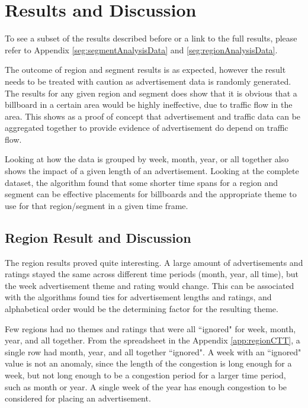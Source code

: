 \documentclass[titlepage,twocolumn]{article}
\begin{document}
\section{Results and Discussion}

\par To see a subset of the results described before or a link to the full results, please refer to Appendix \ref{seg:segmentAnalysisData} and \ref{seg:regionAnalysisData}.


\par The outcome of region and segment results is as expected, however the result needs to be treated with caution as advertisement data is randomly generated. The results for any given region and segment does show that it is obvious that a billboard in a certain area would be highly ineffective, due to traffic flow in the area. This shows as a proof of concept that advertisement and traffic data can be aggregated together to provide evidence of advertisement do depend on traffic flow. 

\par Looking at how the data is grouped by week, month, year, or all together also shows the impact of a given length of an advertisement. Looking at the complete dataset, the algorithm found that some shorter time spans for a region and segment can be effective placements for billboards and the appropriate theme to use for that region/segment in a given time frame.  

\subsection{Region Result and Discussion}

\par The region results proved quite interesting. A large amount of advertisements and ratings stayed the same across different time periods (month, year, all time), but the week advertisement theme and rating would change. This can be associated with the algorithms found ties for advertisement lengths and ratings, and alphabetical order would be the determining factor for the resulting theme. 

\par Few regions had no themes and ratings that were all ``ignored" for week, month, year, and all together. From the spreadsheet in the Appendix \ref{app:regionCTT}, a single row had month, year, and all together ``ignored". A week with an ``ignored" value is not an anomaly, since the length of the congestion is long enough for a week, but not long enough to be a congestion period for a larger time period, such as month or year. A single week of the year has enough congestion to be considered for placing an advertisement. 
\end{document}
